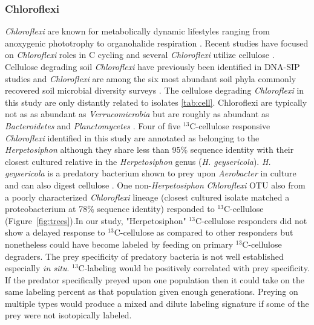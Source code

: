 \documentclass{article}
\begin{document}
\subsubsection{Chloroflexi}\label{cell:chloro}
\textit{Chloroflexi} are known for metabolically dynamic
lifestyles ranging from anoxygenic phototrophy to organohalide respiration
\citep{Hug_2013}. Recent studies have focused on \textit{Chloroflexi} roles in
C cycling \citep{Hug_2013, Goldfarb_2011,Cole_2013} and several
\textit{Chloroflexi} utilize cellulose \citep{Goldfarb_2011, Cole_2013,
Hug_2013}. Cellulose degrading soil \textit{Chloroflexi} have previously been
identified in DNA-SIP studies \citep{Schellenberger_2010} and
\textit{Chloroflexi} are among the six most abundant soil phyla commonly
recovered soil microbial diversity surveys \citep{Janssen2006}. The cellulose
degrading \textit{Chloroflexi} in this study are only distantly related to
isolates \ref{tab:cell}. Chloroflexi are typically not as as abundant as
\textit{Verrucomicrobia} but are roughly as abundant as \textit{Bacteroidetes}
and \textit{Planctomycetes} \citep{Janssen2006}. Four of five
$^{13}$C-cellulose responsive \textit{Chloroflexi} identified in this study are
annotated as belonging to the \textit{Herpetosiphon} although they share less
than 95\% sequence identity with their closest cultured relative in the
\textit{Herpetosiphon} genus (\textit{H. geysericola}). \textit{H. geysericola}
is a predatory bacterium shown to prey upon \textit{Aerobacter} in culture and
can also digest cellulose \citep{Lewin1970}. One non-\textit{Herpetosiphon}
\textit{Chloroflexi} OTU also from a poorly characterized \textit{Chloroflexi}
lineage (closest cultured isolate matched a proteobacterium at 78\% sequence
identity) responded to $^{13}$C-cellulose (Figure~\ref{fig:trees}).In our
study, "Herpetosiphon" $^{13}$C-cellulose responders did not show a delayed
response to $^{13}$C-cellulose as compared to other responders but nonetheless
could have become labeled by feeding on primary $^{13}$C-cellulose degraders.
The prey specificity of predatory bacteria is not well established especially
\textit{in situ}. $^{13}$C-labeling would be positively correlated with prey
specificity. If the predator specifically preyed upon one population then it
could take on the same labeling percent as that population given enough
generations. Preying on multiple types would produce a mixed and dilute
labeling signature if some of the prey were not isotopically labeled.
\end{document}
